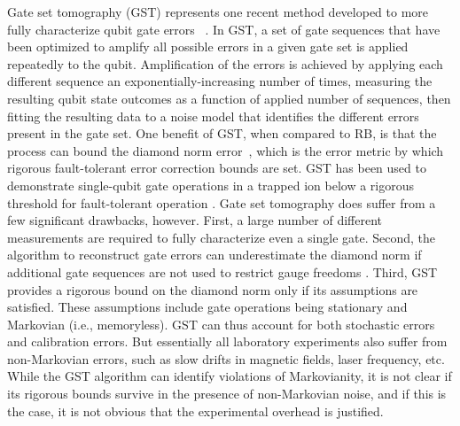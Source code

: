 \documentclass[%
12pt,
 amsmath,amssymb,
]{revtex4-2}
\begin{document}
Gate set tomography (GST) represents one recent method developed to more fully characterize qubit gate errors ~\cite{BlumeKohoutGST2013}. In GST, a set of gate sequences that have been optimized to amplify all possible errors in a given gate set is applied repeatedly to the qubit. Amplification of the errors is achieved by applying each different sequence an exponentially-increasing number of times, measuring the resulting qubit state outcomes as a function of applied number of sequences, then fitting the resulting data to a noise model that identifies the different errors present in the gate set. One benefit of GST, when compared to RB, is that the process can bound the diamond norm error~\cite{blume2017demonstration}, which is the error metric by which rigorous fault-tolerant error correction bounds are set. GST has been used to demonstrate single-qubit gate operations in a trapped ion below a rigorous threshold for fault-tolerant operation \cite{blume2017demonstration}. Gate set tomography does suffer from a few significant drawbacks, however. First, a large number of different measurements are required to fully characterize even a single gate. Second, the algorithm to reconstruct gate errors can underestimate the diamond norm if additional gate sequences are not used to restrict gauge freedoms \cite{MavadiaExperimental2018}. Third, GST provides a rigorous bound on the diamond norm only if its assumptions are satisfied. These assumptions include gate operations being stationary and Markovian (i.e., memoryless). GST can thus account for both stochastic errors and calibration errors. But essentially all laboratory experiments also suffer from non-Markovian errors, such as slow drifts in magnetic fields, laser frequency, etc. While the GST algorithm can identify violations of Markovianity, it is not clear if its rigorous bounds survive in the presence of non-Markovian noise, and if this is the case, it is not obvious that the experimental overhead is justified.
\end{document}
